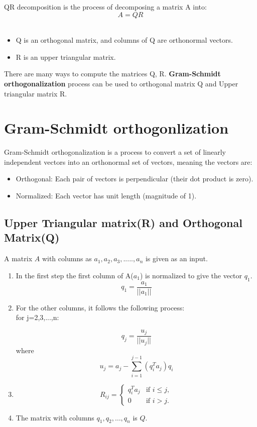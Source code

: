 \documentclass{article}
\begin{document}
QR decomposition is the process of decomposing a matrix A into:$$ A = QR$$\\
\begin{itemize}
    \item Q is an orthogonal matrix, and columns of Q are orthonormal vectors.
    \item R is an upper triangular matrix.
\end{itemize}
There are many ways to compute the matrices Q, R. \textbf{Gram-Schmidt orthogonalization} process can be used to orthogonal matrix Q and Upper triangular matrix R.
\section{Gram-Schmidt orthogonlization}
Gram-Schmidt orthogonalization is a process to convert a set of linearly independent vectors into an orthonormal set of vectors, meaning the vectors are:
\begin{itemize}
    \item Orthogonal: Each pair of vectors is perpendicular (their dot product is zero).
    \item Normalized: Each vector has unit length (magnitude of 1).
\end{itemize}
\subsection{Upper Triangular matrix(R) and Orthogonal Matrix(Q)}
A matrix $A$ with columns as $a_1, a_2, a_3,....., a_n$ is given as an input.\\
\begin{enumerate}
\item In the first step the first column of A($a_1$) is normalized to give the vector $q_1$.$$q_1 =\frac{a_1}{||a_1||}$$
\item For the other columns, it follows the following process:\\
      for j=2,3,...,n:

$$    q_j =\frac{u_j}{||u_j||}$$
where
$$u_j = a_j - \sum_{i=1}^{j-1}(q_i^T a_j)q_i $$

\item $$R_{ij}=\begin{cases}q_i^T a_j & \text{if } i \leq j, \\  0 & \text{if } i > j.\end{cases}$$
\item The matrix with columns \( q_1, q_2, \dots, q_n \) is \( Q \).
\end{enumerate}
\end{document}
